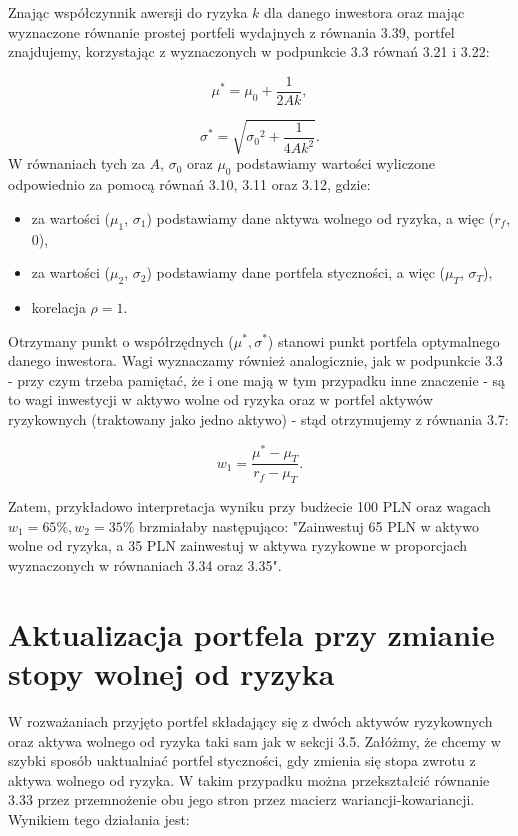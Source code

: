 \documentclass[magister]{dyplom}
\begin{document}
Znając współczynnik awersji do ryzyka $k$ dla danego inwestora oraz mając wyznaczone równanie prostej portfeli wydajnych z równania 3.39, portfel znajdujemy, korzystając z wyznaczonych w podpunkcie 3.3 równań 3.21 i 3.22:

\begin{equation}
	\mu^* = \mu_0 + \frac{1}{2Ak},
\end{equation}

\begin{equation}
	\sigma^* = \sqrt{{\sigma_0}^2+\frac{1}{4Ak^2}}.
\end{equation}
W równaniach tych za $A$, $\sigma_0$ oraz $\mu_0$ podstawiamy wartości wyliczone odpowiednio za pomocą równań 3.10, 3.11 oraz 3.12, gdzie:
\begin{itemize}
	\item za wartości ($\mu_1$, $\sigma_1$) podstawiamy dane aktywa wolnego od ryzyka, a więc ($r_f$, $0$),
	\item za wartości ($\mu_2$, $\sigma_2$) podstawiamy dane portfela styczności, a więc ($\mu_T$, $\sigma_T$),
	\item korelacja $\rho = 1$.
\end{itemize} 
Otrzymany punkt o współrzędnych ($\mu^*, \sigma^*$) stanowi punkt portfela optymalnego danego inwestora. Wagi wyznaczamy również analogicznie, jak w podpunkcie 3.3 - przy czym trzeba pamiętać, że i one mają w tym przypadku inne znaczenie - są to wagi inwestycji w aktywo wolne od ryzyka oraz w portfel aktywów ryzykownych (traktowany jako jedno aktywo) - stąd otrzymujemy z równania 3.7:

\begin{equation}
w_1 = \frac{\mu^* - \mu_T}{r_f - \mu_T}.
\end{equation}

Zatem, przykładowo interpretacja wyniku przy budżecie 100 PLN oraz wagach $w_1 = 65\%, w_2 = 35\%$ brzmiałaby następująco: "Zainwestuj 65 PLN w aktywo wolne od ryzyka, a 35 PLN zainwestuj w aktywa ryzykowne w proporcjach wyznaczonych w równaniach 3.34 oraz 3.35".

\section{Aktualizacja portfela przy zmianie stopy wolnej od ryzyka}
W rozważaniach przyjęto portfel składający się z dwóch aktywów ryzykownych oraz aktywa wolnego od ryzyka taki sam jak w sekcji 3.5. Załóżmy, że chcemy w szybki sposób uaktualniać portfel styczności, gdy zmienia się stopa zwrotu z aktywa wolnego od ryzyka.
W takim przypadku można przekształcić równanie 3.33 przez przemnożenie obu jego stron przez macierz wariancji-kowariancji. Wynikiem tego działania jest:
\end{document}
